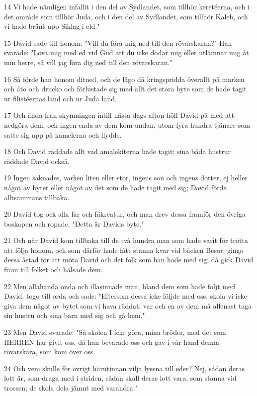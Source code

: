 \par 14 Vi hade nämligen infallit i den del av Sydlandet, som tillhör keretéerna, och i det område som tillhör Juda, och i den del av Sydlandet, som tillhör Kaleb, och vi hade bränt upp Siklag i eld."
\par 15 David sade till honom: "Vill du föra mig ned till den rövarskaran?" Han svarade: "Lova mig med ed vid Gud att du icke dödar mig eller utlämnar mig åt min herre, så vill jag föra dig ned till den rövarskaran."
\par 16 Så förde han honom ditned, och de lågo då kringspridda överallt på marken och åto och drucko och förlustade sig med allt det stora byte som de hade tagit ur filistéernas land och ur Juda land.
\par 17 Och ända från skymningen intill nästa dags afton höll David på med att nedgöra dem; och ingen enda av dem kom undan, utom fyra hundra tjänare som satte sig upp på kamelerna och flydde.
\par 18 Och David räddade allt vad amalekiterna hade tagit; sina båda hustrur räddade David också.
\par 19 Ingen saknades, varken liten eller stor, ingens son och ingens dotter, ej heller något av bytet eller något av det som de hade tagit med sig; David förde alltsammans tillbaka.
\par 20 David tog ock alla får och fäkreatur, och man drev dessa framför den övriga boskapen och ropade: "Detta är Davids byte."
\par 21 Och när David kom tillbaka till de två hundra man som hade varit för trötta att följa honom, och som därför hade fått stanna kvar vid bäcken Besor, gingo dessa åstad för att möta David och det folk som han hade med sig; då gick David fram till folket och hälsade dem.
\par 22 Men allahanda onda och illasinnade män, bland dem som hade följt med David, togo till orda och sade: "Eftersom dessa icke följde med oss, skola vi icke giva dem något av bytet som vi hava räddat; var och en av dem må allenast taga sin hustru och sina barn med sig och gå hem."
\par 23 Men David svarade: "Så skolen I icke göra, mina bröder, med det som HERREN har givit oss, då han bevarade oss och gav i vår hand denna rövarskara, som kom över oss.
\par 24 Och vem skulle för övrigt härutinnan vilja lyssna till eder? Nej, sådan deras lott är, som draga med i striden, sådan skall deras lott vara, som stanna vid trossen; de skola dela jämnt med varandra."
